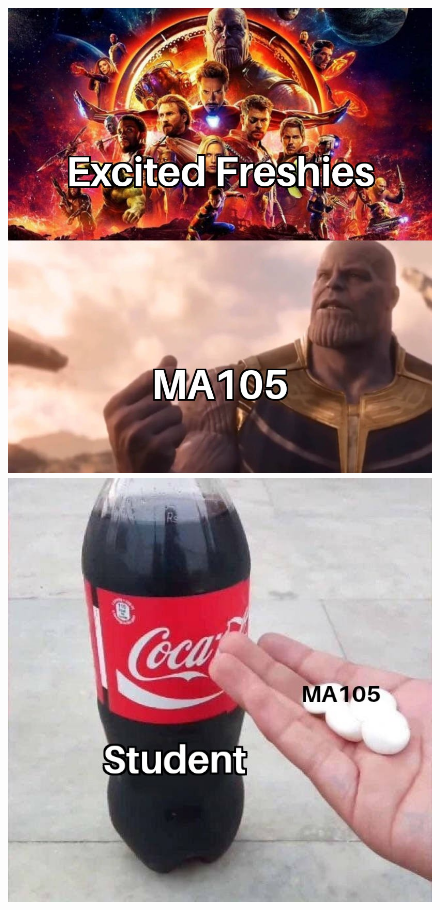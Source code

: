\documentclass[handout, aspectratio=169]{beamer}
\begin{document}
\begin{frame} 
	\begin{figure}[t]
		\begin{minipage}{0.48\textwidth}
			\centering
			\includegraphics[width=7.5 cm]{28.jpg}
			
		\end{minipage}
		\begin{minipage}{0.48\textwidth}
			\centering
			\includegraphics[width=5 cm]{29.jpg}
			
		\end{minipage}
	\end{figure}
\end{frame}
\end{document}
